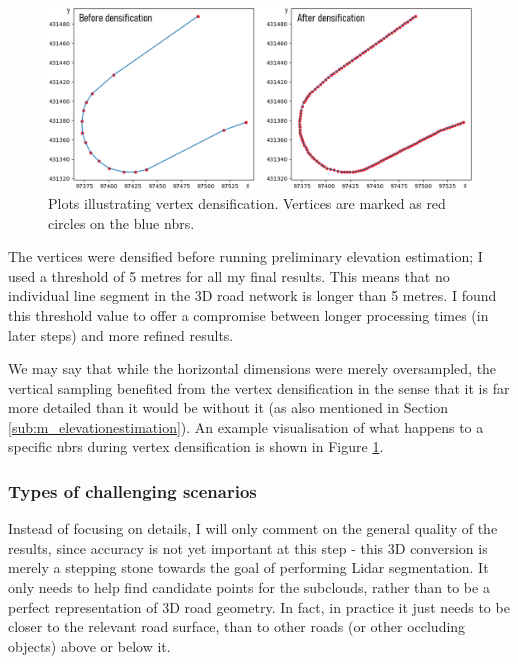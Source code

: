 \begin{figure}
    \centering
    \includegraphics[width=\linewidth]{final_report/figs/elevationestimation1.png}
    \caption[Visualisations illustrating vertex densification]{Plots illustrating vertex densification. Vertices are marked as red circles on the blue \ac{nbrs}.}
    \label{fig:elevationestimation1}
\end{figure}

The vertices were densified before running preliminary elevation estimation; I used a threshold of 5 metres for all my final results. This means that no individual line segment in the 3D road network is longer than 5 metres. I found this threshold value to offer a compromise between longer processing times (in later steps) and more refined results.

We may say that while the horizontal dimensions were merely oversampled, the vertical sampling benefited from the vertex densification in the sense that it is far more detailed than it would be without it (as also mentioned in Section \ref{sub:m_elevationestimation}). An example visualisation of what happens to a specific \ac{nbrs} during vertex densification is shown in Figure \ref{fig:elevationestimation1}.

\subsubsection{Types of challenging scenarios}

Instead of focusing on details, I will only comment on the general quality of the results, since accuracy is not yet important at this step - this 3D conversion is merely a stepping stone towards the goal of performing Lidar segmentation. It only needs to help find candidate points for the subclouds, rather than to be a perfect representation of 3D road geometry. In fact, in practice it just needs to be closer to the relevant road surface, than to other roads (or other occluding objects) above or below it.

